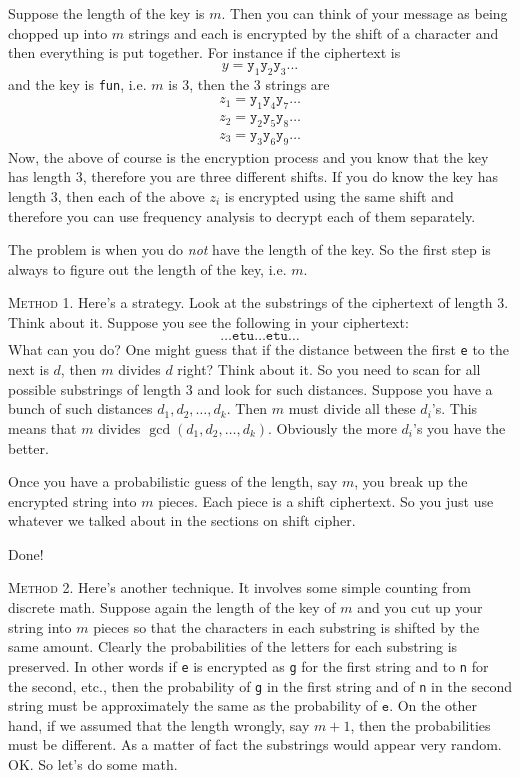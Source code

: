 Suppose the length of the key is $m$.
Then you can think of your message as being chopped up
into $m$ strings and each is encrypted
by the shift of a character and then everything is
put together.
For instance if the ciphertext is
\[
  y =
  \texttt{y}_1
  \texttt{y}_2
  \texttt{y}_3
  ...
\]
and the key is \texttt{fun}, i.e. $m$ is 3, then the 3 strings are
\begin{align*}
  z_1 =
  \texttt{y}_1
  \texttt{y}_4
  \texttt{y}_7
  \ldots \\
  z_2 =
  \texttt{y}_2
  \texttt{y}_5
  \texttt{y}_8
  \ldots \\
  z_3 =
  \texttt{y}_3
  \texttt{y}_6
  \texttt{y}_9
  \ldots 
\end{align*}
Now, the above of course is the encryption process
and you know that the key has length 3, therefore
you are three different shifts.
If you do know the key has length 3, then each
of the above $z_i$ is encrypted using the same shift
and therefore you can use frequency analysis to decrypt
each of them separately.

The problem is when you do \textit{not} have the length of the
key.
So
the first step is always to figure out the length of the
key, i.e.
$m$.

\textsc{Method 1.}
Here's a strategy. Look at the substrings of the ciphertext of
length 3. Think about it.
Suppose you see the following in your
ciphertext:
\[
  \ldots \texttt{etu} \ldots \texttt{etu}\ldots
\]
What can you do? One might guess that if the distance between the
first \texttt{e} to the next is $d$, then $m$ divides
$d$ right?
Think about it. So you need to scan for all possible substrings of
length 3 and look for such distances. Suppose you have a bunch of
such distances $d_1, d_2, \ldots, d_k$. Then $m$ must divide all
these $d_i$'s. This means that $m$ divides
$\gcd(d_1,d_2,\ldots,d_k)$. Obviously the more $d_i$'s you have
the better.






Once you have a probabilistic guess of the length, say $m$,
you break up the encrypted string into $m$
pieces.
Each piece is a shift ciphertext.
So you just use whatever we talked about
in the sections on shift cipher.

Done!

\textsc{Method 2.}
Here's another technique. It involves some simple counting from
discrete math. Suppose again the length of the key of $m$
and you cut up your string into $m$ pieces so that the characters
in each substring is shifted by the same amount. Clearly the
probabilities of the letters for each substring is preserved. In
other words if \texttt{e} is encrypted as \texttt{g} for the first
string and to \texttt{n} for the second, etc., then the
probability of \texttt{g} in the first string and of \texttt{n} in
the second string must be approximately the same as the
probability of $\texttt{e}$. On the other hand, if we assumed that
the length wrongly, say $m+1$, then the probabilities must be
different. As a matter of fact the substrings would appear very
random. OK. So let's do some math.

